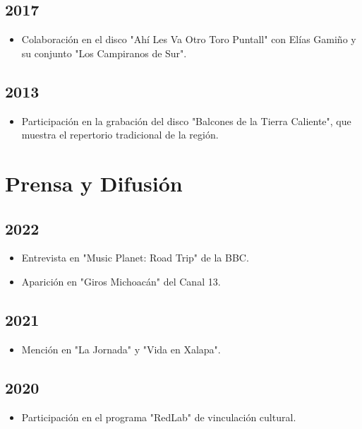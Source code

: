 \documentclass{article}
\begin{document}
\subsection*{2017}
\begin{itemize}[leftmargin=*]
    \item Colaboración en el disco "Ahí Les Va Otro Toro Puntall" con Elías Gamiño y su conjunto "Los Campiranos de Sur".
\end{itemize}

\subsection*{2013}
\begin{itemize}[leftmargin=*]
    \item Participación en la grabación del disco "Balcones de la Tierra Caliente", que muestra el repertorio tradicional de la región.
\end{itemize}

\section*{Prensa y Difusión}

\subsection*{2022}
\begin{itemize}[leftmargin=*]
    \item Entrevista en "Music Planet: Road Trip" de la BBC.
    \item Aparición en "Giros Michoacán" del Canal 13.
\end{itemize}

\subsection*{2021}
\begin{itemize}[leftmargin=*]
    \item Mención en "La Jornada" y "Vida en Xalapa".
\end{itemize}

\subsection*{2020}
\begin{itemize}[leftmargin=*]
    \item Participación en el programa "RedLab" de vinculación cultural.
\end{itemize}
\end{document}
